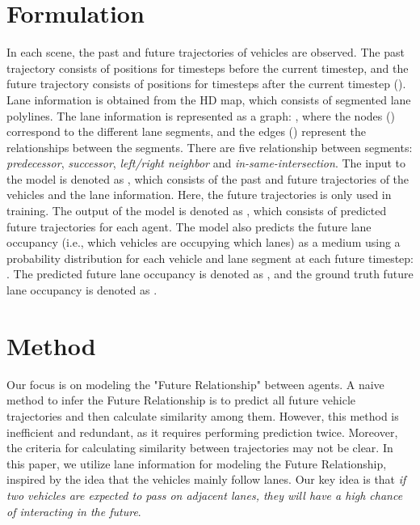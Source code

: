 \documentclass{article} \usepackage{iclr2023_conference,times}
\begin{document}
\section{Formulation}

In each scene, the past and future trajectories of  vehicles are observed. 
The past trajectory  consists of positions for  timesteps before the current timestep, and the future trajectory  consists of positions for  timesteps after the current timestep (). 
Lane information is obtained from the HD map, which consists of  segmented lane polylines. 
The lane information is represented as a graph: , where the nodes () correspond to the different lane segments, and the edges () represent the relationships between the segments. 
There are five relationship between segments: \textit{predecessor}, \textit{successor}, \textit{left/right neighbor} and \textit{in-same-intersection}.
The input to the model is denoted as , which consists of the past and future trajectories of the vehicles and the lane information. 
Here, the future trajectories is only used in training.
The output of the model is denoted as , which consists of  predicted future trajectories for each agent.
The model also predicts the future lane occupancy (i.e., which vehicles are occupying which lanes) as a medium using a probability distribution  for each vehicle and lane segment at each future timestep: . 
The predicted future lane occupancy is denoted as , and the ground truth future lane occupancy is denoted as .

\section{Method}
Our focus is on modeling the "Future Relationship" between agents.
A naive method to infer the Future Relationship is to predict all future vehicle trajectories and then calculate similarity among them.
However, this method is inefficient and redundant, as it requires performing prediction twice.
Moreover, the criteria for calculating similarity between trajectories may not be clear.
In this paper, we utilize lane information for modeling the Future Relationship, inspired by the idea that the vehicles mainly follow lanes.
Our key idea is that \textit{if two vehicles are expected to pass on adjacent lanes, they will have a high chance of interacting in the future}.
\end{document}
